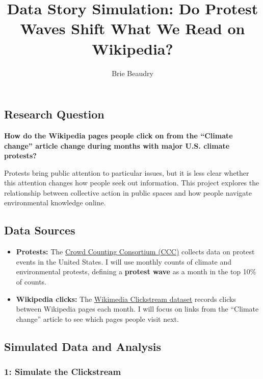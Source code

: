 \documentclass[
  9pt,
  letterpaper,
  DIV=11,
  numbers=noendperiod]{scrartcl}
\title{Data Story Simulation: Do Protest Waves Shift What We Read on
Wikipedia?}
\author{Brie Beaudry}
\date{}
\providecommand{\tightlist}{%
  \setlength{\itemsep}{0pt}\setlength{\parskip}{0pt}}
\begin{document}
\maketitle


\subsection{Research Question}\label{research-question}

\textbf{How do the Wikipedia pages people click on from the ``Climate
change'' article change during months with major U.S. climate protests?}

Protests bring public attention to particular issues, but it is less
clear whether this attention changes how people seek out information.
This project explores the relationship between collective action in
public spaces and how people navigate environmental knowledge online.

\subsection{Data Sources}\label{data-sources}

\begin{itemize}
\tightlist
\item
  \textbf{Protests:} The
  \href{https://dataverse.harvard.edu/dataset.xhtml?persistentId=doi:10.7910/DVN/6OPP7H}{Crowd
  Counting Consortium (CCC)} collects data on protest events in the
  United States. I will use monthly counts of climate and environmental
  protests, defining a \textbf{protest wave} as a month in the top 10\%
  of counts.
\item
  \textbf{Wikipedia clicks:} The
  \href{https://dumps.wikimedia.org/other/clickstream/}{Wikimedia
  Clickstream dataset} records clicks between Wikipedia pages each
  month. I will focus on links from the ``Climate change'' article to
  see which pages people visit next.
\end{itemize}

\subsection{Simulated Data and
Analysis}\label{simulated-data-and-analysis}

\subsubsection{1: Simulate the
Clickstream}\label{simulate-the-clickstream}
\end{document}
